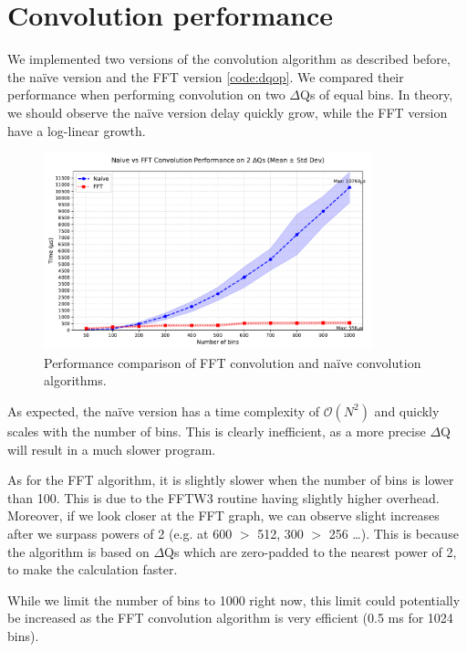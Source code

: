 \section{Convolution performance}
    We implemented two versions of the convolution algorithm as described before, the naïve version and the FFT version \ref{code:dqop}. We compared their performance when performing convolution on two $\Delta$Qs of equal bins. In theory, we should observe the naïve version delay quickly grow, while the FFT version have a log-linear growth.
    \begin{figure}[h]
        \begin{center}
            \includegraphics[width=0.85\textwidth]{img/conv_perf.pdf}
        \end{center}
        \caption{Performance comparison of FFT convolution and naïve convolution algorithms.}
        \label{fig:conv_perf}
    \end{figure}

    As expected, the naïve version has a time complexity of $\mathcal{O}(N^2)$ and quickly scales with the number of bins. This is clearly inefficient, as a more precise $\Delta$Q will result in a much slower program.

As for the FFT algorithm, it is slightly slower when the number of bins is lower than 100. This is due to the FFTW3 routine having slightly higher overhead. Moreover, if we look closer at the FFT graph, we can observe slight increases after we surpass powers of 2 (e.g. at 600 $>$ 512, 300 $>$ 256 \dots). This is because the algorithm is based on $\Delta$Qs which are zero-padded to the nearest power of 2, to make the calculation faster.

While we limit the number of bins to 1000 right now, this limit could potentially be increased as the FFT convolution algorithm is very efficient (0.5 ms for 1024 bins).
